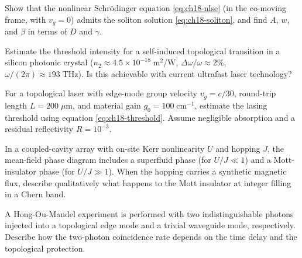 \begin{exercise}
  Show that the nonlinear Schr\"odinger equation
  \eqref{eq:ch18-nlse} (in the co-moving frame, with $v_g=0$) admits
  the soliton solution \eqref{eq:ch18-soliton}, and find $A$, $w$,
  and $\beta$ in terms of $D$ and $\gamma$.
\end{exercise}

\begin{exercise}
  Estimate the threshold intensity for a self-induced topological
  transition in a silicon photonic crystal ($n_2\approx
  4.5\times 10^{-18}\;\mathrm{m}^2/\mathrm{W}$,
  $\Delta\omega/\omega\approx 2\%$, $\omega/(2\pi)\approx
  193\;\mathrm{THz}$).  Is this achievable with current ultrafast
  laser technology?
\end{exercise}

\begin{exercise}
  For a topological laser with edge-mode group velocity $v_g=c/30$,
  round-trip length $L=200\;\mu\mathrm{m}$, and material gain
  $g_0=100\;\mathrm{cm}^{-1}$, estimate the lasing threshold using
  equation \eqref{eq:ch18-threshold}.  Assume negligible absorption
  and a residual reflectivity $R=10^{-3}$.
\end{exercise}

\begin{exercise}
  In a coupled-cavity array with on-site Kerr nonlinearity $U$ and
  hopping $J$, the mean-field phase diagram includes a superfluid
  phase (for $U/J\ll 1$) and a Mott-insulator phase (for $U/J\gg 1$).
  When the hopping carries a synthetic magnetic flux, describe
  qualitatively what happens to the Mott insulator at integer filling
  in a Chern band.
\end{exercise}

\begin{exercise}
  A Hong-Ou-Mandel experiment is performed with two indistinguishable
  photons injected into a topological edge mode and a trivial waveguide
  mode, respectively.  Describe how the two-photon coincidence rate
  depends on the time delay and the topological protection.
\end{exercise}
